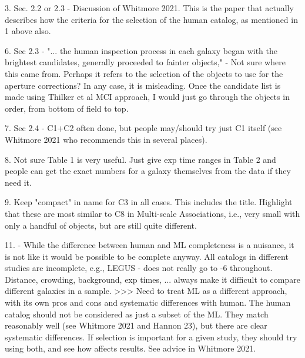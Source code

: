 3. Sec. 2.2 or 2.3 - Discussion of Whitmore 2021. This is the paper that actually describes how the criteria for the selection of the human catalog, as mentioned in 1 above also.




 


 

6. Sec 2.3 - "... the human inspection process in each galaxy began with the brightest candidates, generally proceeded to fainter objects," - Not sure where this came from. Perhaps it refers to the selection of the objects to use for the aperture corrections? In any case, it is misleading. Once the candidate list is made using Thilker et al MCI approach, I would just go through the objects in order, from bottom of field to top.


7. Sec 2.4 - C1+C2 often done, but people may/should try just C1 itself (see Whitmore 2021 who recommends this in several places).

 
8. Not sure Table 1 is very useful. Just give exp time ranges in Table 2  and people can get the exact numbers for a galaxy themselves from the data if they need it.

 

9. Keep "compact" in name for C3 in all cases. This includes the title.  Highlight that these are most similar to C8 in Multi-scale Associations, i.e., very small with only a handful of objects, but are still quite different.

 


 

11. - While the difference between human and ML completeness is a nuisance, it is not like it would be possible to be complete anyway. All catalogs in different studies are incomplete, e.g., LEGUS - does not really go to -6 throughout. Distance, crowding, background, exp times, ... always make it difficult to compare different galaxies in a sample. >>> Need to treat ML as a different approach, with its own pros and cons and systematic differences with human. The human catalog should not be considered as just a subset of the ML. They match reasonably well (see Whitmore 2021 and Hannon 23), but there are clear systematic differences.  If selection is important for a given study, they should try using both, and see how affects results. See advice in Whitmore 2021.

